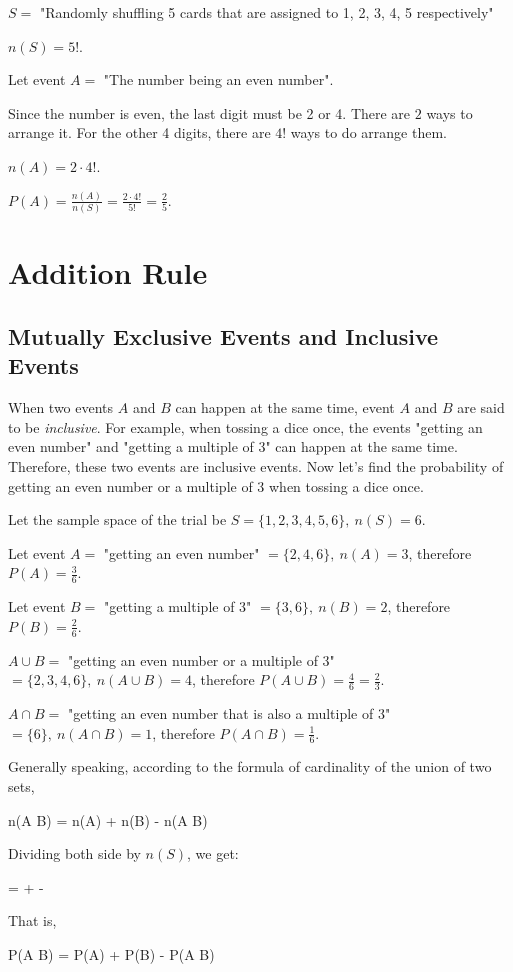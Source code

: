 \documentclass{report}
\begin{document}
\begin{multicols}{2}
\begin{enumerate}
          \sol{}

          $S =$ "Randomly shuffling 5 cards that are assigned to 1, 2, 3, 4, 5 respectively"

          $n(S) = 5!$.

          Let event $A =$ "The number being an even number".

          Since the number is even, the last digit must be 2 or 4. There are $2$ ways to
          arrange it. For the other 4 digits, there are $4!$ ways to do arrange them.

          $n(A) = 2 \cdot 4!$.

          $P(A) = \frac{n(A)}{n(S)} = \frac{2 \cdot 4!}{5!} = \frac{2}{5}$.
  \end{enumerate}

  \section{Addition Rule}

  \subsection*{Mutually Exclusive Events and Inclusive Events}

  When two events $A$ and $B$ can happen at the same time, event $A$ and $B$ are
  said to be \emph{inclusive}. For example, when tossing a dice once, the events
  "getting an even number" and "getting a multiple of 3" can happen at the same
  time. Therefore, these two events are inclusive events. Now let's find the
  probability of getting an even number or a multiple of 3 when tossing a dice
  once.

  \noindent Let the sample space of the trial be $S = \{1, 2, 3, 4, 5, 6\},\ n(S) = 6$.

  \noindent Let event $A = $ "getting an even number" $ = \{2, 4, 6\},\ n(A) = 3$, therefore $P(A) = \frac{3}{6}$.

  \noindent Let event $B = $ "getting a multiple of 3" $ = \{3, 6\},\ n(B) = 2$, therefore $P(B) = \frac{2}{6}$.

  \noindent $A \cup B = $ "getting an even number or a multiple of 3" $ = \{2, 3, 4, 6\},\ n(A \cup B) = 4$, therefore $P(A \cup B) = \frac{4}{6} = \frac{2}{3}$.

  \noindent $A \cap B = $ "getting an even number that is also a multiple of 3" $ = \{6\},\ n(A \cap B) = 1$, therefore $P(A \cap B) = \frac{1}{6}$.

  \noindent Generally speaking, according to the formula of cardinality of the union of two sets,
  \begin{cequation}
    n(A \cup B) = n(A) + n(B) - n(A \cap B)
  \end{cequation}
  Dividing both side by $n(S)$, we get:
  \begin{cequation}
     =  +  - 
  \end{cequation}
  That is,
  \begin{cequation}
    P(A \cup B) = P(A) + P(B) - P(A \cap B)
  \end{cequation}


\end{multicols}
\end{document}
